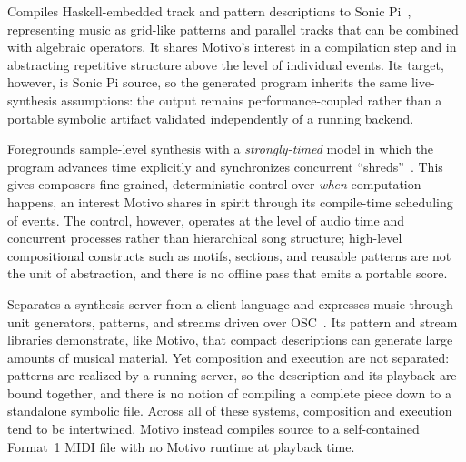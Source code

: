  Compiles Haskell-embedded track and pattern descriptions to Sonic Pi~\cite{Du_Bois_Ribeiro_2019},
representing music as grid-like patterns and parallel tracks that can be combined with algebraic operators.
It shares Motivo's interest in a compilation step and in abstracting repetitive structure above the level of individual
events.
Its target, however, is Sonic Pi source, so the generated program inherits the same live-synthesis assumptions: the
output remains performance-coupled rather than a portable symbolic artifact validated independently of a running
backend.

 Foregrounds sample-level synthesis with a \emph{strongly-timed} model in which the program advances
time explicitly and synchronizes concurrent ``shreds''~\cite{Wang_Cook_2003,Wang_2008}.
This gives composers fine-grained, deterministic control over \emph{when} computation happens, an interest Motivo
shares in spirit through its compile-time scheduling of events.
The control, however, operates at the level of audio time and concurrent processes rather than hierarchical song
structure; high-level compositional constructs such as motifs, sections, and reusable patterns are not the unit of
abstraction, and there is no offline pass that emits a portable score.

 Separates a synthesis server from a client language and expresses music through unit generators,
patterns, and streams driven over OSC~\cite{McCartney_2002,Wilson_Cottle_Collins_2011}.
Its pattern and stream libraries demonstrate, like Motivo, that compact descriptions can generate large amounts of
musical material.
Yet composition and execution are not separated: patterns are realized by a running server, so the description and its
playback are bound together, and there is no notion of compiling a complete piece down to a standalone symbolic file.
Across all of these systems, composition and execution tend to be intertwined.
Motivo instead compiles source to a self-contained Format~1 MIDI file with no Motivo runtime at playback time.
